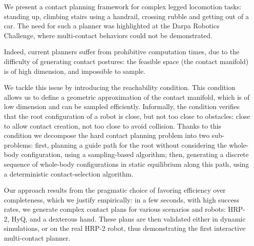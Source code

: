 We present a contact planning framework for complex legged locomotion tasks: standing up, climbing stairs using a handrail, crossing rubble and getting out of a car. The need for such a planner was highlighted at the Darpa Robotics Challenge, where multi-contact behaviors
could not be demonstrated.

Indeed, current planners suffer from prohibitive computation times, due to the difficulty
of generating contact postures: the feasible space (the contact manifold) is of high dimension,
and impossible to sample.

We tackle this issue by introducing the reachability condition. This condition allows us to define
a geometric approximation of the contact manifold, which is of low dimension and can be sampled efficiently.
Informally, the condition verifies that the root configuration of a robot is close, but not too close to obstacles: close to allow contact creation, not too close to avoid collision. Thanks to this condition we decompose the hard contact planning problem into two
sub-problems: first, planning a guide path for the root without considering the whole-body configuration, using a sampling-based algorithm; then, generating a discrete sequence of whole-body configurations in static equilibrium along this path, using a deterministic contact-selection algorithm. 

Our approach results from the pragmatic choice of favoring efficiency over completeness, which we justify empirically: in a
few seconds, with high success rates, we generate complex contact plans for various scenarios and robots: HRP-2, HyQ, and a dexterous hand. These plans are then validated either in dynamic simulations, or on the real HRP-2 robot, thus demonstrating 
the first interactive multi-contact planner.
